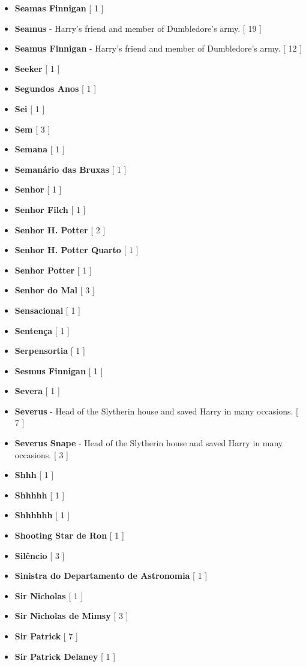 \documentclass[a4paper]{article}
\begin{document}
\begin{itemize}
	\item \textbf{Seamas Finnigan} [ 1 ]
	\item \textbf{Seamus} - Harry's friend and member of Dumbledore's army. [ 19 ]
	\item \textbf{Seamus Finnigan} - Harry's friend and member of Dumbledore's army. [ 12 ]
	\item \textbf{Seeker} [ 1 ]
	\item \textbf{Segundos Anos} [ 1 ]
	\item \textbf{Sei} [ 1 ]
	\item \textbf{Sem} [ 3 ]
	\item \textbf{Semana} [ 1 ]
	\item \textbf{Semanário das Bruxas} [ 1 ]
	\item \textbf{Senhor} [ 1 ]
	\item \textbf{Senhor Filch} [ 1 ]
	\item \textbf{Senhor H. Potter} [ 2 ]
	\item \textbf{Senhor H. Potter Quarto} [ 1 ]
	\item \textbf{Senhor Potter} [ 1 ]
	\item \textbf{Senhor do Mal} [ 3 ]
	\item \textbf{Sensacional} [ 1 ]
	\item \textbf{Sentença} [ 1 ]
	\item \textbf{Serpensortia} [ 1 ]
	\item \textbf{Sesmus Finnigan} [ 1 ]
	\item \textbf{Severa} [ 1 ]
	\item \textbf{Severus} - Head of the Slytherin house and saved Harry in many occasions. [ 7 ]
	\item \textbf{Severus Snape} - Head of the Slytherin house and saved Harry in many occasions. [ 3 ]
	\item \textbf{Shhh} [ 1 ]
	\item \textbf{Shhhhh} [ 1 ]
	\item \textbf{Shhhhhh} [ 1 ]
	\item \textbf{Shooting Star de Ron} [ 1 ]
	\item \textbf{Silêncio} [ 3 ]
	\item \textbf{Sinistra do Departamento de Astronomia} [ 1 ]
	\item \textbf{Sir Nicholas} [ 1 ]
	\item \textbf{Sir Nicholas de Mimsy} [ 3 ]
	\item \textbf{Sir Patrick} [ 7 ]
	\item \textbf{Sir Patrick Delaney} [ 1 ]

\end{itemize}
\end{document}
